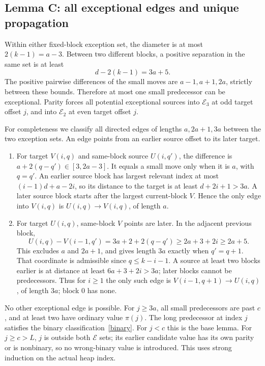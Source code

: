 \documentclass[10pt,a4paper]{article}
\newcommand{\E}{\mathcal E}
\newcommand{\p}{\pi}
\begin{document}
\subsection{Lemma C: all exceptional edges and unique propagation}
Within either fixed-block exception set, the diameter is at most $2(k-1)=a-3$. Between two different blocks, a positive separation in the same set is at least
\begin{equation}\label{sep}
 d-2(k-1)=3a+5.
\end{equation}
The positive pairwise differences of the small moves are $a-1,a+1,2a$, strictly between these bounds. Therefore at most one small predecessor can be exceptional. Parity forces all potential exceptional sources into $\E_3$ at odd target offset $j$, and into $\E_2$ at even target offset $j$.

For completeness we classify all directed edges of lengths $a,2a+1,3a$ between the two exception sets. An edge points from an earlier source offset to its later target.
\begin{enumerate}[label=\textnormal{(\roman*)}]
\item For target $V(i,q)$ and same-block source $U(i,q')$, the difference is $a+2(q-q')\in[3,2a-3]$. It equals a small move only when it is $a$, with $q=q'$. An earlier source block has largest relevant index at most $(i-1)d+a-2i$, so its distance to the target is at least $d+2i+1>3a$. A later source block starts after the largest current-block $V$. Hence the only edge into $V(i,q)$ is $U(i,q)\longrightarrow V(i,q)$, of length $a$.
\item For target $U(i,q)$, same-block $V$ points are later. In the adjacent previous block,
\[
 U(i,q)-V(i-1,q')=3a+2+2(q-q')\ge2a+3+2i\ge2a+5.
\]
This excludes $a$ and $2a+1$, and gives length $3a$ exactly when $q'=q+1$. That coordinate is admissible since $q\le k-i-1$. A source at least two blocks earlier is at distance at least $6a+3+2i>3a$; later blocks cannot be predecessors. Thus for $i\ge1$ the only such edge is $V(i-1,q+1)\longrightarrow U(i,q)$, of length $3a$; block 0 has none.
\end{enumerate}
No other exceptional edge is possible. For $j\ge3a$, all small predecessors are past $c$, and at least two have ordinary value $\p(j)$. The long predecessor at index $j$ satisfies the binary classification~\eqref{binary}. For $j<c$ this is the base lemma. For $j\ge c>L$, $j$ is outside both $\E$ sets; its earlier candidate value has its own parity or is nonbinary, so no wrong-binary value is introduced. This uses strong induction on the actual heap index.
\end{document}
